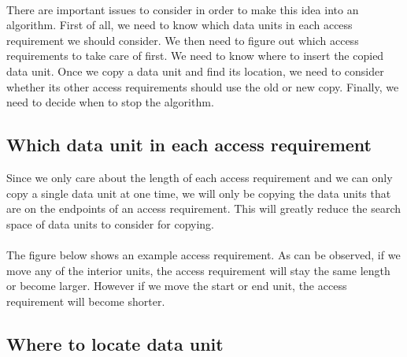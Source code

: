 \documentclass[conference]{acmsiggraph}
\begin{document}
\\
There are important issues to consider in order to make this idea into an algorithm. First of all, we need to know which data units in each access requirement we should consider. We then need to figure out which access requirements to take care of first. We need to know where to insert the copied data unit. Once we copy a data unit and find its location, we need to consider whether its other access requirements should use the old or new copy. Finally, we need to decide when to stop the algorithm.  

\subsection{Which data unit in each access requirement}

Since we only care about the length of each access requirement and we can only copy a single data unit at one time, we will only be copying the data units that are on the endpoints of an access requirement. This will greatly reduce the search space of data units to consider for copying. \\
\\
The figure below shows an example access requirement. As can be observed, if we move any of the interior units, the access requirement will stay the same length or become larger. However if we move the start or end unit, the access requirement will become shorter. 


\subsection{Where to locate data unit}
\end{document}
